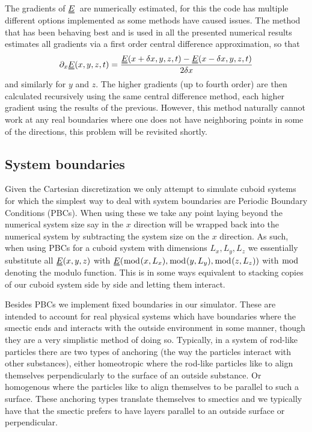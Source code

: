 \documentclass[12pt]{article}
\newcommand{\duf}[2]{\stackunder[0.5pt]{\stackunder[0.8pt]{\stackunder[1pt]{\ensuremath{#1}}{\rule{\widthof{\ensuremath{#2}}*\real{0.9}}{.1ex}}}{\rule{\widthof{\ensuremath{#2}}*\real{0.9}}{.1ex}}}{}}
\newcommand{\du}[1]{\duf{#1}{#1}}
\newcommand{\pp}{\ensuremath{\partial}}
\newcommand{\EE}{\ensuremath{\du{E}}}
\begin{document}
    The gradients of \EE\ are numerically estimated, for this the code has multiple different options implemented as some methods have caused issues.
    The method that has been behaving best and is used in all the presented numerical results estimates all gradients via a first order central difference approximation, so that
    \begin{equation}\label{eq:gradcentral}
        \pp_x \EE(x, y, z, t) = \frac{\EE(x+\delta x, y, z, t) - \EE(x-\delta x, y, z, t)}{2\delta x}
    \end{equation}
    and similarly for $y$ and $z$.
    The higher gradients (up to fourth order) are then calculated recursively using the same central difference method, each higher gradient using the results of the previous.
    However, this method naturally cannot work at any real boundaries where one does not have neighboring points in some of the directions, this problem will be revisited shortly.

    \subsection{System boundaries}\label{sec:ns_sb}
        Given the Cartesian discretization we only attempt to simulate cuboid systems for which the simplest way to deal with system boundaries are Periodic Boundary Conditions (PBCs).
        When using these we take any point laying beyond the numerical system size say in the $x$ direction will be wrapped back into the numerical system by subtracting the system size on the $x$ direction.
        As such, when using PBCs for a cuboid system with dimensions $L_x, L_y, L_z$ we essentially substitute all $\EE(x, y, z)$ with $\EE(\bmod(x, L_x), \bmod(y, L_y), \bmod(z, L_z))$ with $\bmod$ denoting the modulo function.
        This is in some ways equivalent to stacking copies of our cuboid system side by side and letting them interact.

        Besides PBCs we implement fixed boundaries in our simulator.
        These are intended to account for real physical systems which have boundaries where the smectic ends and interacts with the outside environment in some manner, though they are a very simplistic method of doing so.
        Typically, in a system of rod-like particles there are two types of anchoring (the way the particles interact with other substances), either homeotropic where the rod-like particles like to align themselves perpendicularly to the surface of an outside substance.
        Or homogenous where the particles like to align themselves to be parallel to such a surface\cite{oswaldNematicCholestericLiquid2005}.
        These anchoring types translate themselves to smectics and we typically have that the smectic prefers to have layers parallel to an outside surface or perpendicular.
\end{document}
